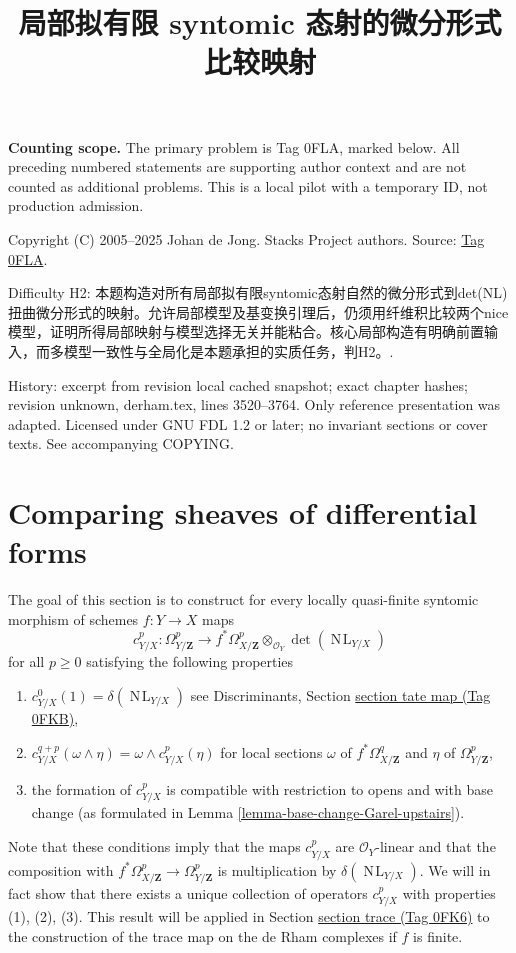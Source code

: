 \documentclass{amsart}
\theoremstyle{plain}
\theoremstyle{definition}
\theoremstyle{remark}
\numberwithin{equation}{subsection}
\def\NL{\mathop{N\!L}\nolimits}
\begin{document}
\title[Stacks Project, Tag 0FLA]{局部拟有限 syntomic 态射的微分形式比较映射}
\maketitle
\noindent\textbf{Counting scope.} The primary problem is Tag 0FLA, marked below. All preceding numbered statements are supporting author context and are not counted as additional problems. This is a local pilot with a temporary ID, not production admission.


\noindent Copyright (C) 2005--2025 Johan de Jong. Stacks Project authors. Source: \href{https://stacks.math.columbia.edu/tag/0FLA}{Tag 0FLA}.

\noindent Difficulty H2: 本题构造对所有局部拟有限syntomic态射自然的微分形式到det(NL)扭曲微分形式的映射。允许局部模型及基变换引理后，仍须用纤维积比较两个nice模型，证明所得局部映射与模型选择无关并能粘合。核心局部构造有明确前置输入，而多模型一致性与全局化是本题承担的实质任务，判H2。.

\noindent History: excerpt from revision local cached snapshot; exact chapter hashes; revision unknown, derham.tex, lines 3520--3764. Only reference presentation was adapted. Licensed under GNU FDL 1.2 or later; no invariant sections or cover texts. See accompanying COPYING.

\section{Comparing sheaves of differential forms}
\label{section-quasi-finite-syntomic}

\noindent
The goal of this section is to construct for every locally quasi-finite
syntomic morphism of schemes $f : Y \to X$ maps
$$
c^p_{Y/X} :
\Omega^p_{Y/\mathbf{Z}}
\longrightarrow
f^*\Omega^p_{X/\mathbf{Z}} \otimes_{\mathcal{O}_Y} \det(\NL_{Y/X})
$$
for all $p \geq 0$ satisfying the following properties
\begin{enumerate}
\item
\label{item-degree-zero}
$c_{Y/X}^0(1) = \delta(\NL_{Y/X})$ see
Discriminants, Section \href{https://stacks.math.columbia.edu/tag/0FKB}{section tate map (Tag 0FKB)},
\item
\label{item-multiplicative}
$c_{Y/X}^{q + p}(\omega \wedge \eta) = \omega \wedge c_{Y/X}^p(\eta)$
for local sections $\omega$ of $f^*\Omega^q_{X/\mathbf{Z}}$
and $\eta$ of $\Omega^p_{Y/\mathbf{Z}}$,
\item
\label{item-base-change}
the formation of $c^p_{Y/X}$ is compatible with restriction to opens
and with base change
(as formulated in Lemma \ref{lemma-base-change-Garel-upstairs}).
\end{enumerate}
Note that these conditions imply that the maps $c^p_{Y/X}$ are
$\mathcal{O}_Y$-linear and that the composition with
$f^*\Omega^p_{X/\mathbf{Z}} \to \Omega^p_{Y/\mathbf{Z}}$
is multiplication by $\delta(\NL_{Y/X})$.
We will in fact show that there exists a unique collection of operators
$c^p_{Y/X}$ with properties (1), (2), (3). This result will be applied in
Section \href{https://stacks.math.columbia.edu/tag/0FK6}{section trace (Tag 0FK6)} to the construction of the trace map on
the de Rham complexes if $f$ is finite.
\end{document}
